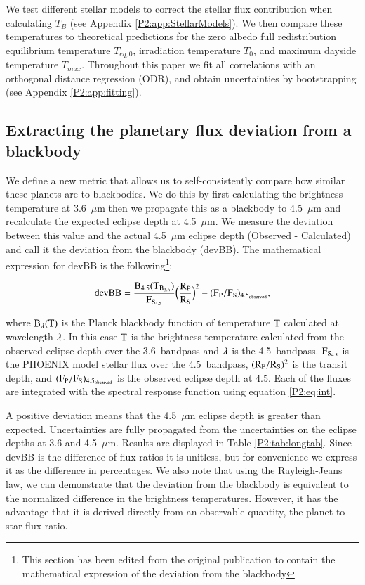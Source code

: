 
We test different stellar models to correct the stellar flux contribution when calculating $T_B$ (see Appendix \ref{P2:app:StellarModels}). We then compare these temperatures to theoretical predictions for the zero albedo full redistribution equilibrium temperature $T_{eq,\textit{0}}$, irradiation temperature $T_0$, and maximum dayside temperature $T_{max}$. Throughout this paper we fit all correlations with an orthogonal distance regression (ODR), and obtain uncertainties by bootstrapping (see Appendix \ref{P2:app:fitting}).

\subsection{Extracting the planetary flux deviation from a blackbody}

We define a new metric that allows us to self-consistently compare how similar these planets are to blackbodies. We do this by first calculating the brightness temperature at 3.6~$\mu$m then we propagate this as a blackbody to 4.5~$\mu$m and recalculate the expected eclipse depth at 4.5~$\mu$m. We measure the deviation between this value and the actual 4.5~$\mu$m eclipse depth (Observed - Calculated) and call it the deviation from the blackbody (devBB). The mathematical expression for devBB is the following\footnote{This section has been edited from the original publication to contain the mathematical expression of the deviation from the blackbody}:

\begin{equation}
    \rm devBB  = \frac{B_{4.5}(T_{B_{3.6}})}{F_{S_{4.5}}} \Big(\frac{R_P}{R_S}\Big)^2 - (F_P/F_S)_{4.5_{observed}},
\end{equation}

where $\rm B_{\lambda}(T)$ is the Planck blackbody function of temperature $\rm T$ calculated at wavelength $\rm \lambda$. In this case $\rm T$ is the brightness temperature calculated from the observed \spitzer eclipse depth over the 3.6\um~\spitzer bandpass and $\rm \lambda$ is the 4.5\um~\spitzer bandpass. $\rm F_{S_{4.5}}$ is the PHOENIX model stellar flux over the 4.5\um~\spitzer bandpass, $\rm (R_P/R_S)^2$ is the transit depth, and $\rm (F_P/F_S)_{4.5_{observed}}$ is the observed \spitzer eclipse depth at 4.5\um. Each of the fluxes are integrated with the \spitzer spectral response function using equation \ref{P2:eq:int}.

A positive deviation means that the 4.5~$\mu$m eclipse depth is greater than expected. Uncertainties are fully propagated from the uncertainties on the eclipse depths at 3.6 and 4.5~$\mu$m. Results are displayed in Table \ref{P2:tab:longtab}. Since devBB is the difference of flux ratios it is unitless, but for convenience we express it as the difference in percentages. We also note that using the Rayleigh-Jeans law, we can demonstrate that the deviation from the blackbody is equivalent to the normalized difference in the brightness temperatures. However, it has the advantage that it is derived directly from an observable quantity, the planet-to-star flux ratio.

